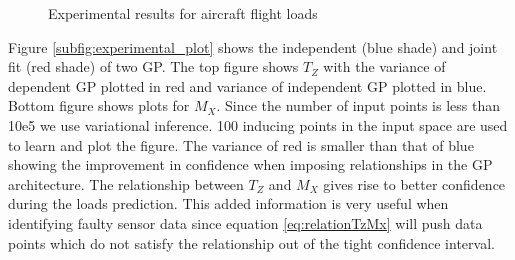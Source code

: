 \begin{figure}[!ht]
  \centering
  \quad
  
\caption{Experimental results for aircraft flight loads}
  \label{fig:expFlightLoadsRelationship}
\end{figure}

Figure \ref{subfig:experimental_plot} shows the independent (blue shade) and joint fit (red shade) of two GP. The top figure shows \(T_{Z}\) with the variance of dependent GP plotted in red and variance of independent GP plotted in blue. Bottom figure shows plots for \(M_{X}\). Since the number of input points is less than 10e5 we use variational inference. 100 inducing points in the input space are used to learn and plot the figure. The variance of red is smaller than that of blue showing the improvement in confidence when imposing relationships in the GP architecture. The relationship between \(T_{Z}\) and \(M_{X}\) gives rise to better confidence during the loads prediction. This added information is very useful when identifying faulty sensor data since equation \ref{eq:relationTzMx} will push data points which do not satisfy the relationship out of the tight confidence interval.

